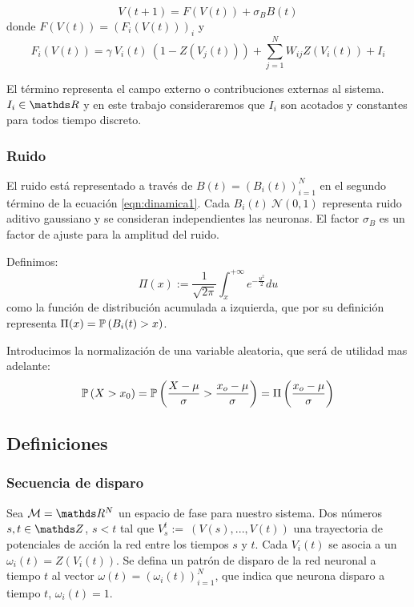 \begin{equation}
    V(t+1) = F(V(t)) + \sigma_B B(t)
    \label{eqn:dinamica1}
\end{equation}
donde $F(V(t)) = \left(F_i(V(t))\right)_i$ y
\begin{equation}
    F_i(V(t)) = \gamma\ V_i(t)\ (1-Z(V_j(t))) + \sum_{j=1}^N W_{ij} Z(V_i(t)) +I_i 
    \label{eqn:dinamica2}
\end{equation}

El término representa el campo externo o contribuciones externas al sistema. $I_i \in \reals$ y en este trabajo consideraremos que $I_i$ son acotados y constantes para todos tiempo discreto.

\subsubsection{Ruido}

El ruido está representado a través de $B(t)=(B_i(t))^N_{i=1}$ en el segundo término de la ecuación \eqref{eqn:dinamica1}. Cada $B_i(t)~\mathcal{N}(0,1)$ representa ruido aditivo gaussiano y se consideran independientes las neuronas. El factor $\sigma_B$ es un factor de ajuste para la amplitud del ruido.

Definimos:
\begin{equation}
    \Pi(x) := \frac{1}{\sqrt{2\pi}} \int_x^{+\infty} e^{-\frac{u^2}{2}} du
\end{equation}
como la función de distribución acumulada a izquierda, que por su definición representa $\Pi(x)=\mathbb{P}\left(B_i(t)>x\right)$.

Introducimos la normalización de una variable aleatoria, que será de utilidad mas adelante:
\begin{equation}
    \mathbb{P}\left(X>x_0\right) = \mathbb{P}\left(\frac{X-\mu}{\sigma}>\frac{x_o-\mu}{\sigma}\right) = \Pi\left(\frac{x_o-\mu}{\sigma}\right)
    \label{eqn:normgauss}
\end{equation}

\subsection{Definiciones}

\subsubsection{Secuencia de disparo}

Sea $\mathcal{M}=\reals^N$ un espacio de fase para nuestro sistema. Dos números $s,t \in \enteros$, $s<t$ tal que $V_s^t :=~(V(s),...,V(t))$ una trayectoria de potenciales de acción la red entre los tiempos $s$ y $t$. Cada $V_i(t)$ se asocia a un $\omega_i(t) = Z(V_i(t))$. Se defina un patrón de disparo de la red neuronal a tiempo $t$ al vector $\omega(t)= (\omega_i(t))^N_{i=1}$, que indica que neurona disparo a tiempo $t$, $\omega_i(t)=1$.

